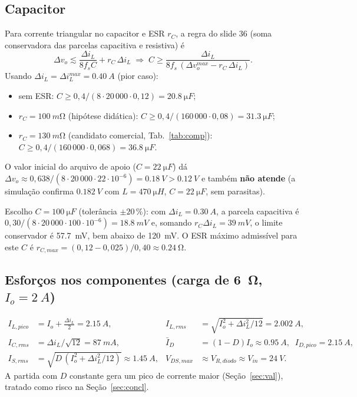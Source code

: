\documentclass[11pt,a4paper]{article}
\newcommand{\fs}{f_s}
\newcommand{\Vin}{V_{in}}
\newcommand{\dIL}{\Delta i_L}
\newcommand{\dvo}{\Delta v_o}
\begin{document}
\subsection{Capacitor}
Para corrente triangular no capacitor e ESR $r_C$, a regra do slide 36 (soma conservadora das parcelas capacitiva e resistiva) \'e
\begin{equation}
 \dvo\lesssim\frac{\dIL}{8\fs C}+r_C\,\dIL
 \;\Rightarrow\;
 C\ge\frac{\dIL}{8\fs\,(\dvo^{max}-r_C\,\dIL)} .
\end{equation}
Usando $\dIL=\dIL^{max}=\SI{0,40}{A}$ (pior caso):
\begin{itemize}
 \item sem ESR: $C\ge 0{,}4/(8\cdot20\,000\cdot0{,}12)=\SI{20,8}{\micro F}$;
 \item $r_C=\SI{100}{m\ohm}$ (hip\'otese did\'atica): $C\ge0{,}4/(160\,000\cdot0{,}08)=\SI{31,3}{\micro F}$;
 \item $r_C=\SI{130}{m\ohm}$ (candidato comercial, Tab.~\ref{tab:comp}): $C\ge0{,}4/(160\,000\cdot0{,}068)=\SI{36,8}{\micro F}$.
\end{itemize}
O valor inicial do arquivo de apoio ($C=\SI{22}{\micro F}$) d\'a $\dvo\approx0{,}638/(8\cdot20\,000\cdot22\cdot10^{-6})=\SI{0,18}{V}>\SI{0,12}{V}$ e tamb\'em \textbf{n\~ao atende} (a simula\c{c}\~ao confirma $\SI{0,182}{V}$ com $L=\SI{470}{\micro H}$, $C=\SI{22}{\micro F}$, sem parasitas).

Escolho $C=\SI{100}{\micro F}$ (toler\^ancia $\pm20\,\%$): com $\dIL=\SI{0,30}{A}$, a parcela capacitiva \'e $0{,}30/(8\cdot20\,000\cdot100\cdot10^{-6})=\SI{18,8}{mV}$ e, somando $r_C\dIL=\SI{39}{mV}$, o limite conservador \'e \SI{57,7}{mV}, bem abaixo de \SI{120}{mV}. O ESR m\'aximo admiss\'ivel para este $C$ \'e $r_{C,max}=(0{,}12-0{,}025)/0{,}40\approx\SI{0,24}{\ohm}$.

\subsection{Esfor\c{c}os nos componentes (carga de \SI{6}{\ohm}, $I_o=\SI{2}{A}$)}
\begin{align}
 I_{L,pico}&=I_o+\tfrac{\dIL}{2}=\SI{2,15}{A}, &
 I_{L,rms}&=\sqrt{I_o^2+\dIL^2/12}=\SI{2,002}{A},\\
 I_{C,rms}&=\dIL/\sqrt{12}=\SI{87}{mA}, &
 \bar I_{D}&=(1-D)I_o\approx\SI{0,95}{A},\;\; I_{D,pico}=\SI{2,15}{A},\\
 I_{S,rms}&=\sqrt{D\,(I_o^2+\dIL^2/12)}\approx\SI{1,45}{A}, &
 V_{DS,max}&\approx V_{R,diodo}\approx\Vin=\SI{24}{V}.
\end{align}
A partida com $D$ constante gera um pico de corrente maior (Se\c{c}\~ao~\ref{sec:val}), tratado como risco na Se\c{c}\~ao~\ref{sec:concl}.
\end{document}
